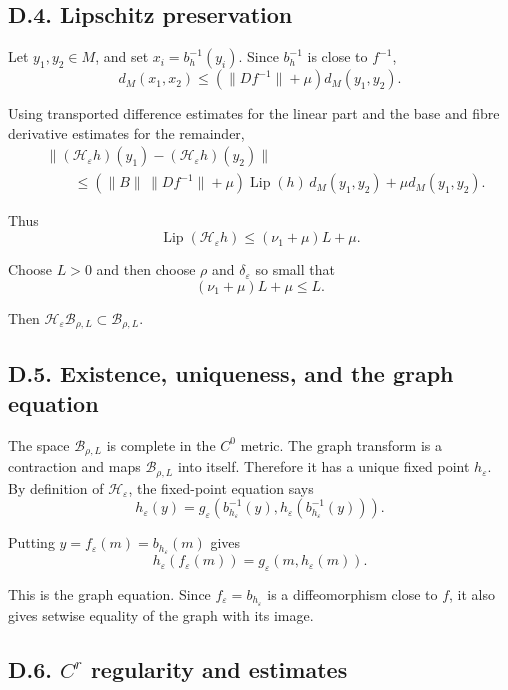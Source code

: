 \documentclass[12pt,a4paper]{article}
\theoremstyle{plain}
\numberwithin{equation}{section}
\numberwithin{theorem}{section}
\begin{document}
\subsection{D.4. Lipschitz preservation}

Let $y_1,y_2\in M$, and set $x_i=b_h^{-1}(y_i)$. Since $b_h^{-1}$ is close to $f^{-1}$,
\[
d_M(x_1,x_2)
\le
(\|Df^{-1}\|+
\mu)d_M(y_1,y_2).
\]

Using transported difference estimates for the linear part and the base and fibre derivative estimates for the remainder,
\[
\begin{aligned}
&\|(\mathcal H_\varepsilon h)(y_1)-(\mathcal H_\varepsilon h)(y_2)\| \\
&\qquad\le
(\|B\|\,\|Df^{-1}\|+
\mu)
\operatorname{Lip}(h)
\,d_M(y_1,y_2)
+
\mu d_M(y_1,y_2).
\end{aligned}
\]

Thus
\[
\operatorname{Lip}(\mathcal H_\varepsilon h)
\le
(\nu_1+
\mu)L+
\mu.
\]

Choose $L>0$ and then choose $\rho$ and $\delta_\varepsilon$ so small that
\[
(\nu_1+
\mu)L+
\mu
\le L.
\]

Then $\mathcal H_\varepsilon\mathcal B_{\rho,L}\subset\mathcal B_{\rho,L}$.

\subsection{D.5. Existence, uniqueness, and the graph equation}

The space $\mathcal B_{\rho,L}$ is complete in the $C^0$ metric. The graph transform is a contraction and maps $\mathcal B_{\rho,L}$ into itself. Therefore it has a unique fixed point $h_\varepsilon$. By definition of $\mathcal H_\varepsilon$, the fixed-point equation says
\[
h_\varepsilon(y)
=
g_\varepsilon(b_{h_\varepsilon}^{-1}(y),
h_\varepsilon(b_{h_\varepsilon}^{-1}(y))).
\]

Putting $y=f_\varepsilon(m)=b_{h_\varepsilon}(m)$ gives
\[
h_\varepsilon(f_\varepsilon(m))
=
g_\varepsilon(m,h_\varepsilon(m)).
\]

This is the graph equation. Since $f_\varepsilon=b_{h_\varepsilon}$ is a diffeomorphism close to $f$, it also gives setwise equality of the graph with its image.

\subsection{D.6. $C^r$ regularity and estimates}
\end{document}
